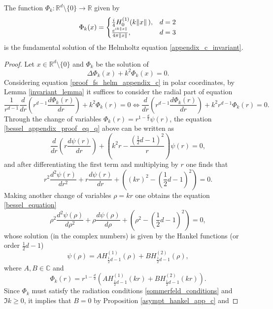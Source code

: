 \begin{proposition}
    The function \(\Phi_k: \mathbb{R}^d \setminus \{0\} \rightarrow \mathbb{R}\) given by
    \[
    \Phi_k(x) = \begin{cases}
        \frac{i}{4} H_0^{(1)}(k \norm*{x}), & d=2\\
        \frac{e^{i k \norm*{x}}}{4 \pi \norm*{x}}, & d = 3
    \end{cases}    
    \]
    is the fundamental solution of the Helmholtz equation \eqref{appendix_c_invariant}.
\end{proposition}
\begin{proof}
    Let \(x \in \mathbb{R}^d \setminus \{0\}\) and \(\Phi_k\) be the solution of
    \begin{equation}\label{proof_fs_helm_appendix_c}
        \Delta \Phi_k(x) + k^2 \Phi_k(x) = 0.
    \end{equation}
    Considering equation \eqref{proof_fs_helm_appendix_c} in polar coordinates, by Lemma \ref{invariant_lemma} it suffices to consider the radial part of equation
    \begin{equation}\label{bessel_appendix_proof_eq_q}
        \frac{1}{r^{d-1}} \frac{d}{d r}\left(r^{d-1}\frac{d \Phi_k(r)}{d r}\right) + k^2\Phi_k(r) = 0 \iff \frac{d}{d r}\left(r^{d-1}\frac{d \Phi_k(r)}{d r}\right) + k^2 r^{d-1}\Phi_k(r) = 0.
    \end{equation}
    Through the change of variables \(\Phi_k(r) = r^{1-\frac{d}{2}}\psi(r)\), the equation \eqref{bessel_appendix_proof_eq_q} above can be written as
    \[
        \frac{d}{d r}\left(r \frac{d \psi(r)}{d r}\right) + \left(k^2 r - \frac{\left(\frac{1}{2}d-1\right)^2}{r}\right)\psi(r) = 0,
    \]
    and after differentiating the first term and multiplying by \(r\) one finds that 
    \[
        r^2\frac{d^2 \psi(r)}{d r^2} + r\frac{d \psi(r)}{d r} + \left(\left(kr\right)^2-\left(\frac{1}{2}d-1\right)^2\right) = 0.
    \]
    Making another change of variables \(\rho = k r\) one obtains the equation \eqref{bessel_equation}
    \[
        \rho^2\frac{d^2 \psi(\rho)}{d \rho^2} + \rho\frac{d \psi(\rho)}{d \rho} + \left(\rho^2-\left(\frac{1}{2}d-1\right)^2\right) = 0,
    \] 
    whose solution (in the complex numbers) is given by the Hankel functions (or order \(\frac{1}{2}d-1\))
    \[
        \psi(\rho) = A H^{(1)}_{\frac{1}{2}d-1}(\rho) + B H^{(2)}_{\frac{1}{2}d-1}(\rho),
    \]
    where \(A, B \in \mathbb{C}\) and 
    \[
        \Phi_k(r) = r^{1-\frac{d}{2}} \left(A H^{(1)}_{\frac{1}{2}d-1}(kr) + B H^{(2)}_{\frac{1}{2}d-1}(kr)\right).
    \]
    Since \(\Phi_k\) must satisfy the radiation conditions \ref{sommerfeld_conditions} and \(\Im{k} \geq 0\), it implies that \(B=0\) by Proposition \ref{asympt_hankel_app_c} and

\end{proof}
